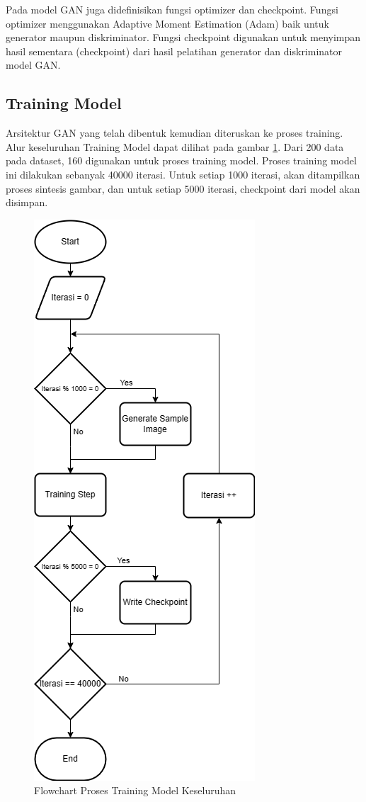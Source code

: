 Pada model GAN juga didefinisikan fungsi optimizer dan checkpoint.
Fungsi optimizer menggunakan Adaptive Moment Estimation (Adam) baik untuk generator maupun diskriminator. 
Fungsi checkpoint digunakan untuk menyimpan hasil sementara (checkpoint) dari hasil pelatihan generator dan diskriminator model GAN.

\subsection{Training Model}
\label{training}

Arsitektur GAN yang telah dibentuk kemudian diteruskan ke proses training. 
Alur keseluruhan Training Model dapat dilihat pada gambar \ref{fig:training}. 
Dari 200 data pada dataset, 160 digunakan untuk proses training model. 
Proses training model ini dilakukan sebanyak 40000 iterasi. 
Untuk setiap 1000 iterasi, akan ditampilkan proses sintesis gambar, dan untuk setiap 5000 iterasi, checkpoint dari model akan disimpan.

\begin{figure}[ht]
  \centering
  \includegraphics[scale=0.47]{gambar/Training_model.png}
  \caption{Flowchart Proses Training Model Keseluruhan}
  \label{fig:training}
\end{figure}

